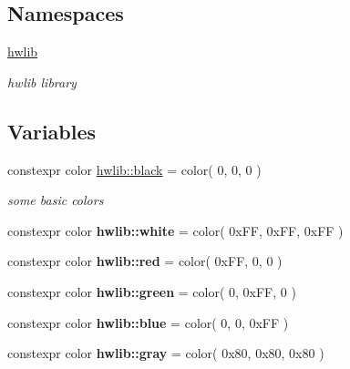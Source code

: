 \subsection*{Namespaces}
\begin{DoxyCompactItemize}
\item 
 \hyperlink{namespacehwlib}{hwlib}
\begin{DoxyCompactList}\small\item\em hwlib library \end{DoxyCompactList}\end{DoxyCompactItemize}
\subsection*{Variables}
{\bf }\par
\begin{DoxyCompactItemize}
\item 
constexpr color \hyperlink{namespacehwlib_aa9c056fa29bc9af9f55d4b774bb3898a}{hwlib\+::black} = color( 0, 0, 0 )\hypertarget{namespacehwlib_aa9c056fa29bc9af9f55d4b774bb3898a}{}\label{namespacehwlib_aa9c056fa29bc9af9f55d4b774bb3898a}

\begin{DoxyCompactList}\small\item\em some basic colors \end{DoxyCompactList}\item 
constexpr color {\bfseries hwlib\+::white} = color( 0x\+F\+F, 0x\+F\+F, 0x\+F\+F )\hypertarget{namespacehwlib_a4ef9e33ddbcac5e4dc5cf3190f9174a9}{}\label{namespacehwlib_a4ef9e33ddbcac5e4dc5cf3190f9174a9}

\item 
constexpr color {\bfseries hwlib\+::red} = color( 0x\+F\+F, 0, 0 )\hypertarget{namespacehwlib_a5b1deea018f5b78012a5556553740614}{}\label{namespacehwlib_a5b1deea018f5b78012a5556553740614}

\item 
constexpr color {\bfseries hwlib\+::green} = color( 0, 0x\+F\+F, 0 )\hypertarget{namespacehwlib_a2473de6d95a7df78dac207d1b7e87c5c}{}\label{namespacehwlib_a2473de6d95a7df78dac207d1b7e87c5c}

\item 
constexpr color {\bfseries hwlib\+::blue} = color( 0, 0, 0x\+F\+F )\hypertarget{namespacehwlib_ae1184edd3998bcdb7061c0b1d38683b7}{}\label{namespacehwlib_ae1184edd3998bcdb7061c0b1d38683b7}

\item 
constexpr color {\bfseries hwlib\+::gray} = color( 0x80, 0x80, 0x80 )\hypertarget{namespacehwlib_a2e05dcb77590ae391ad3027f4097ec77}{}\label{namespacehwlib_a2e05dcb77590ae391ad3027f4097ec77}


\end{DoxyCompactItemize}
